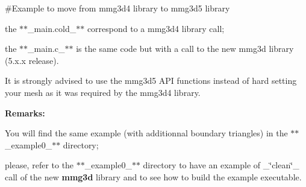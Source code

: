 \#\+Example to move from mmg3d4 library to mmg3d5 library


\begin{DoxyItemize}
\item the $\ast$$\ast$\+\_\+main.cold\+\_\+$\ast$$\ast$ correspond to a mmg3d4 library call;
\item the $\ast$$\ast$\+\_\+main.c\+\_\+$\ast$$\ast$ is the same code but with a call to the new mmg3d library (5.\+x.\+x release).
\end{DoxyItemize}

It is strongly advised to use the mmg3d5 API functions instead of hard setting your mesh as it was required by the mmg3d4 library.

{\bfseries{Remarks\+:}}
\begin{DoxyItemize}
\item You will find the same example (with additionnal boundary triangles) in the $\ast$$\ast$\+\_\+example0\+\_\+$\ast$$\ast$ directory;
\item please, refer to the $\ast$$\ast$\+\_\+example0\+\_\+$\ast$$\ast$ directory to have an example of \+\_\+\char`\"{}clean\char`\"{}\+\_\+ call of the new {\bfseries{mmg3d}} library and to see how to build the example executable. 
\end{DoxyItemize}